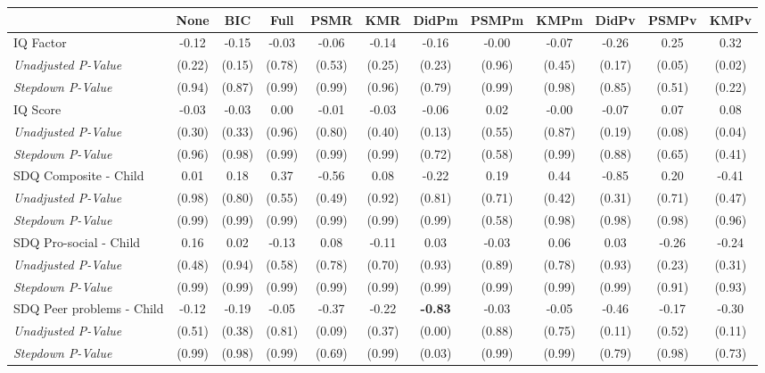 \begin{tabular}{l c c c c c c c c c c c}
\toprule
 & None & BIC & Full & PSMR & KMR & DidPm & PSMPm & KMPm & DidPv & PSMPv & KMPv \\
\midrule
IQ Factor & -0.12 & -0.15 & -0.03 & -0.06 & -0.14 & -0.16 & -0.00 & -0.07 & -0.26 & 0.25 & 0.32 \\
\quad \textit{Unadjusted P-Value} & (0.22) & (0.15) & (0.78) & (0.53) & (0.25) & (0.23) & (0.96) & (0.45) & (0.17) & (0.05) & (0.02) \\
\quad \textit{Stepdown P-Value} & (0.94) & (0.87) & (0.99) & (0.99) & (0.96) & (0.79) & (0.99) & (0.98) & (0.85) & (0.51) & (0.22) \\
IQ Score & -0.03 & -0.03 & 0.00 & -0.01 & -0.03 & -0.06 & 0.02 & -0.00 & -0.07 & 0.07 & 0.08 \\
\quad \textit{Unadjusted P-Value} & (0.30) & (0.33) & (0.96) & (0.80) & (0.40) & (0.13) & (0.55) & (0.87) & (0.19) & (0.08) & (0.04) \\
\quad \textit{Stepdown P-Value} & (0.96) & (0.98) & (0.99) & (0.99) & (0.99) & (0.72) & (0.58) & (0.99) & (0.88) & (0.65) & (0.41) \\
SDQ Composite - Child & 0.01 & 0.18 & 0.37 & -0.56 & 0.08 & -0.22 & 0.19 & 0.44 & -0.85 & 0.20 & -0.41 \\
\quad \textit{Unadjusted P-Value} & (0.98) & (0.80) & (0.55) & (0.49) & (0.92) & (0.81) & (0.71) & (0.42) & (0.31) & (0.71) & (0.47) \\
\quad \textit{Stepdown P-Value} & (0.99) & (0.99) & (0.99) & (0.99) & (0.99) & (0.99) & (0.58) & (0.98) & (0.98) & (0.98) & (0.96) \\
SDQ Pro-social - Child & 0.16 & 0.02 & -0.13 & 0.08 & -0.11 & 0.03 & -0.03 & 0.06 & 0.03 & -0.26 & -0.24 \\
\quad \textit{Unadjusted P-Value} & (0.48) & (0.94) & (0.58) & (0.78) & (0.70) & (0.93) & (0.89) & (0.78) & (0.93) & (0.23) & (0.31) \\
\quad \textit{Stepdown P-Value} & (0.99) & (0.99) & (0.99) & (0.99) & (0.99) & (0.99) & (0.99) & (0.99) & (0.99) & (0.91) & (0.93) \\
SDQ Peer problems - Child & -0.12 & -0.19 & -0.05 & -0.37 & -0.22 & \textbf{ -0.83 } & -0.03 & -0.05 & -0.46 & -0.17 & -0.30 \\
\quad \textit{Unadjusted P-Value} & (0.51) & (0.38) & (0.81) & (0.09) & (0.37) & (0.00) & (0.88) & (0.75) & (0.11) & (0.52) & (0.11) \\
\quad \textit{Stepdown P-Value} & (0.99) & (0.98) & (0.99) & (0.69) & (0.99) & (0.03) & (0.99) & (0.99) & (0.79) & (0.98) & (0.73) \\

\end{tabular}
